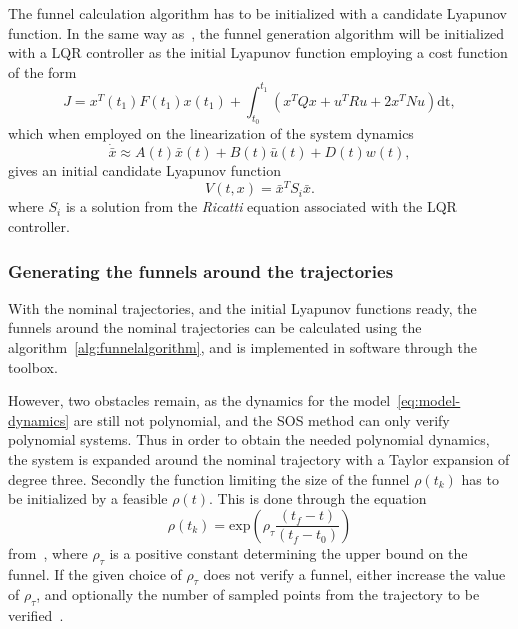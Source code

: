 The funnel calculation algorithm has to be initialized with a candidate Lyapunov
function. In the same way
as~\cite[Majumdar]{majumdarFunnelLibrariesRealtime2017}, the funnel generation
algorithm will be initialized with a \ac{LQR} controller as the initial Lyapunov
function employing a cost function of the form
\begin{equation}
  J = x^{T}(t_1)F(t_1)x(t_1) + \int_{t_{0}}^{t_{1}} \left( x^{T}Qx + u^{T}Ru + 2x^TNu \right) \mathrm{dt},
\end{equation}
which when employed on the linearization of the system dynamics
\begin{equation}
  \dot{\bar{x}} \approx A(t)\bar{x}(t) + B(t)\bar{u}(t) +D(t)w(t),
\end{equation}
gives an initial candidate Lyapunov function
\begin{equation}
  V(t,x) = {\bar{x}}^{T}S_{i}\bar{x}.
\end{equation}
where \(S_{i}\) is a solution from the \textit{Ricatti} equation associated with
the \ac{LQR} controller.

\subsubsection{Generating the funnels around the trajectories}
\label{subsec:generating-funnels}

With the nominal trajectories, and the initial Lyapunov functions ready, the
funnels around the nominal trajectories can be calculated using the
algorithm~\ref{alg:funnelalgorithm}, and is implemented in software through the
~\cite[sostools]{sostools} toolbox.

However, two obstacles remain, as the dynamics for the
model~\ref{eq:model-dynamics} are still not polynomial, and the \ac{SOS} method
can only verify polynomial systems. Thus in order to obtain the needed
polynomial dynamics, the system is expanded around the nominal trajectory with a
Taylor expansion of degree three. Secondly the function limiting the size of the
funnel \(\rho(t_{k})\) has to be initialized by a feasible \(\rho(t)\). This is
done through the equation
\begin{equation}
  \rho(t_{k}) = \mathrm{exp}\left( \rho_{\tau}\frac{\left( t_{f} - t \right)}{\left( t_{f} - t_{0}  \right)}\right)
\end{equation}
from~\cite[eq.~6.sec~3]{tobenkinInvariantFunnelsTrajectories2010}, where
\(\rho_{\tau}\) is a positive constant determining the upper bound on the
funnel. If the given choice of \(\rho_{\tau}\) does not verify a funnel, either
increase the value of \(\rho_{\tau}\), and optionally the number of sampled
points from the trajectory to be
verified~\cite{tobenkinInvariantFunnelsTrajectories2010}.

